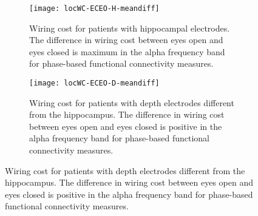 \documentclass[11pt, onecolumn]{article}
\begin{document}
\begin{figure}[p]
\begin{adjustbox}{minipage=\linewidth,scale=0.9}
  \begin{subfigure}[t]{0.5\linewidth}
    \centering
    \texttt{[image: locWC-ECEO-H-meandiff]} 
    \caption{Wiring cost for patients with hippocampal electrodes. The difference in wiring cost between eyes open and eyes closed is maximum in the alpha frequency band for phase-based functional connectivity measures.} 
    \label{figi-2:a} 
  \end{subfigure}%
  \hspace{1ex}
  \begin{subfigure}[t]{0.5\linewidth}
    \centering
    \texttt{[image: locWC-ECEO-D-meandiff]} 
    \caption{Wiring cost for patients with depth electrodes different from the hippocampus. The difference in wiring cost between eyes open and eyes closed is positive in the alpha frequency band for phase-based functional connectivity measures.} 
    \label{figi-2:b} 
  \end{subfigure} 
  

\end{adjustbox}
\end{figure}
\end{document}

